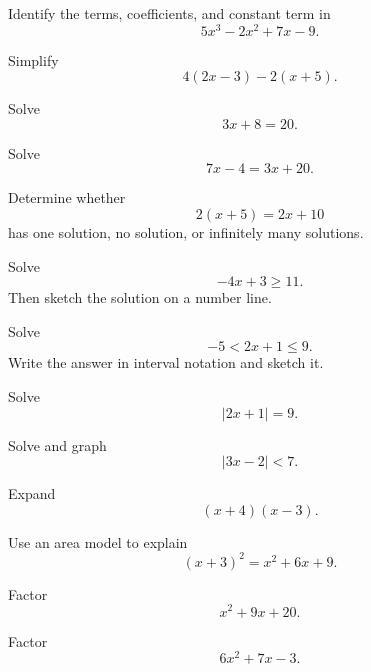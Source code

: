 \begin{exercise}[1]
Identify the terms, coefficients, and constant term in
\[ 5x^3-2x^2+7x-9. \]
\end{exercise}

\begin{exercise}[1]
Simplify
\[ 4(2x-3)-2(x+5). \]
\end{exercise}

\begin{exercise}[1]
Solve
\[ 3x+8=20. \]
\end{exercise}

\begin{exercise}[1]
Solve
\[ 7x-4=3x+20. \]
\end{exercise}

\begin{exercise}[1]
Determine whether
\[ 2(x+5)=2x+10 \]
has one solution, no solution, or infinitely many solutions.
\end{exercise}

\begin{exercise}[1]
Solve
\[ -4x+3\geq11. \]
Then sketch the solution on a number line.
\end{exercise}

\begin{exercise}[1]
Solve
\[ -5<2x+1\leq9. \]
Write the answer in interval notation and sketch it.
\end{exercise}

\begin{exercise}[1]
Solve
\[ |2x+1|=9. \]
\end{exercise}

\begin{exercise}[2]
Solve and graph
\[ |3x-2|<7. \]
\end{exercise}

\begin{exercise}[1]
Expand
\[ (x+4)(x-3). \]
\end{exercise}

\begin{exercise}[1]
Use an area model to explain
\[ (x+3)^2=x^2+6x+9. \]
\end{exercise}

\begin{exercise}[1]
Factor
\[ x^2+9x+20. \]
\end{exercise}

\begin{exercise}[2]
Factor
\[ 6x^2+7x-3. \]
\end{exercise}

